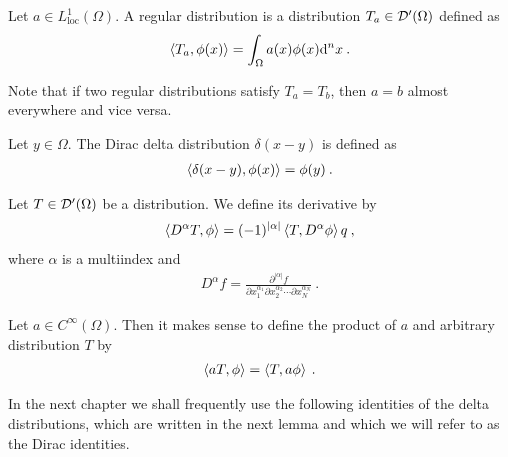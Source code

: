 \begin{definition}
    Let $a \in L^1_{\text{loc}}(\Omega)$. A regular distribution is a distribution $T_a \in \mathcal{D'}(\Omega)$ defined as
    \begin{align}
        \left \langle T_a ,\phi(x) \right \rangle = \int_\Omega a(x) \phi(x) \mathrm{d}^n x \:.
    \end{align}
\end{definition}

Note that if two regular distributions satisfy $T_a = T_b$, then $a=b$ almost everywhere and vice versa.

\begin{definition}
    Let $y \in \Omega$. The Dirac delta distribution $\delta(x-y)$ is defined as
    \begin{align}
        \left \langle \delta(x-y) ,\phi(x) \right \rangle = \phi(y) \:. 
    \end{align}
\end{definition}



\begin{definition}
    Let $T \in \mathcal{D'}(\Omega)$ be a distribution. We define its derivative by
    \begin{align}
        \left \langle D^\alpha T ,\phi \right \rangle = (-1)^{|\alpha|} \left \langle T ,D^\alpha \phi \right \rangle q \:,
    \end{align}
    where $\alpha$ is a multiindex and
    \begin{align}
        D^\alpha f = \frac{\partial^{|\alpha|} f}{\partial x_1^{\alpha_1} \partial x_2^{\alpha_2} \cdots \partial x^{\alpha_N}_N} \:.
    \end{align}
\end{definition}

Let $a \in C^\infty(\Omega)$. Then it makes sense to define the product of $a$ and arbitrary distribution $T$ by
\begin{align}
    \left \langle a T ,\phi \right \rangle = \left \langle T ,a \phi \right \rangle \:.
\end{align}

In the next chapter we shall frequently use the following identities of the delta distributions, which are written in the next lemma and which we will refer to as the Dirac identities.


